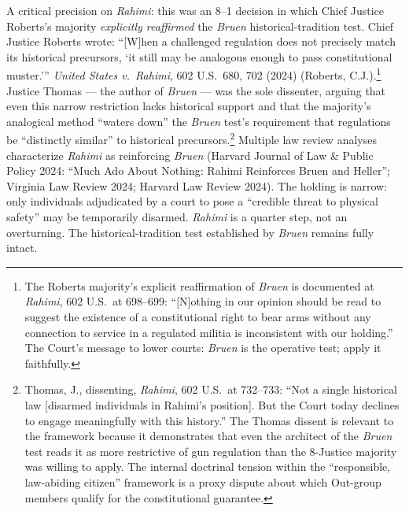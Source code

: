 A critical precision on \textit{Rahimi}: this was an 8--1 decision in which Chief Justice Roberts's majority \textit{explicitly reaffirmed} the \textit{Bruen} historical-tradition test. Chief Justice Roberts wrote: ``[W]hen a challenged regulation does not precisely match its historical precursors, `it still may be analogous enough to pass constitutional muster.''' \textit{United States v.\ Rahimi}, 602 U.S.\ 680, 702 (2024) (Roberts, C.J.).\footnote{The Roberts majority's explicit reaffirmation of \textit{Bruen} is documented at \textit{Rahimi}, 602 U.S.\ at 698--699: ``[N]othing in our opinion should be read to suggest the existence of a constitutional right to bear arms without any connection to service in a regulated militia is inconsistent with our holding.'' The Court's message to lower courts: \textit{Bruen} is the operative test; apply it faithfully.} Justice Thomas --- the author of \textit{Bruen} --- was the sole dissenter, arguing that even this narrow restriction lacks historical support and that the majority's analogical method ``waters down'' the \textit{Bruen} test's requirement that regulations be ``distinctly similar'' to historical precursors.\footnote{Thomas, J., dissenting, \textit{Rahimi}, 602 U.S.\ at 732--733: ``Not a single historical law [disarmed individuals in Rahimi's position]. But the Court today declines to engage meaningfully with this history.'' The Thomas dissent is relevant to the framework because it demonstrates that even the architect of the \textit{Bruen} test reads it as more restrictive of gun regulation than the 8-Justice majority was willing to apply. The internal doctrinal tension within the ``responsible, law-abiding citizen'' framework is a proxy dispute about which Out-group members qualify for the constitutional guarantee.} Multiple law review analyses characterize \textit{Rahimi} as reinforcing \textit{Bruen} (Harvard Journal of Law \& Public Policy 2024: ``Much Ado About Nothing: Rahimi Reinforces Bruen and Heller''; Virginia Law Review 2024; Harvard Law Review 2024). The holding is narrow: only individuals adjudicated by a court to pose a ``credible threat to physical safety'' may be temporarily disarmed. \textit{Rahimi} is a quarter step, not an overturning. The historical-tradition test established by \textit{Bruen} remains fully intact.

